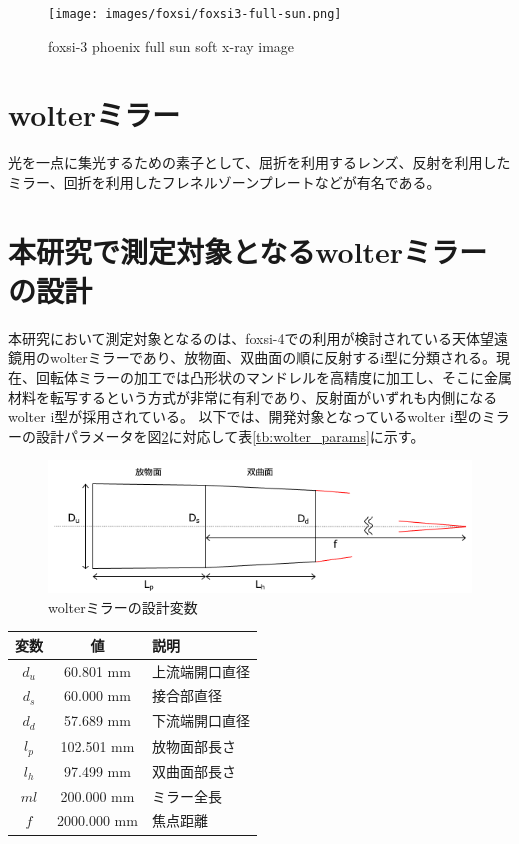 \documentclass[dvipdfmx,autodetect-engine]{jreport}
\begin{document}
\begin{figure}[h!]
\centering
\texttt{[image: images/foxsi/foxsi3-full-sun.png]}
\caption{foxsi-3 phoenix full sun soft x-ray image}
\label{fig:foxsi-fullsun-image}
\end{figure}

\section{wolterミラー}

光を一点に集光するための素子として、屈折を利用するレンズ、反射を利用したミラー、回折を利用したフレネルゾーンプレートなどが有名である。

\section{本研究で測定対象となるwolterミラーの設計}
本研究において測定対象となるのは、foxsi-4での利用が検討されている天体望遠鏡用のwolterミラーであり、放物面、双曲面の順に反射するi型に分類される。現在、回転体ミラーの加工では凸形状のマンドレルを高精度に加工し、そこに金属材料を転写するという方式が非常に有利であり、反射面がいずれも内側になるwolter i型が採用されている。
以下では、開発対象となっているwolter i型のミラーの設計パラメータを図\ref{fig:wolter_params}に対応して表\ref{tb:wolter_params}に示す。

\begin{figure}[h!]
\centering
\includegraphics[scale=0.55]{images/mirror_experiment/mirror_params.png}
\caption{wolterミラーの設計変数}
\label{fig:wolter_params}
\end{figure}

\begin{center}
  \begin{tabular}{|c|c|l|} \hline
    変数 & 値 & 説明 \\ \hline
    $d_u$ & 60.801 mm & 上流端開口直径 \\
    $d_s$ & 60.000 mm & 接合部直径 \\
    $d_d$ & 57.689 mm & 下流端開口直径 \\
    $l_p$ & 102.501 mm & 放物面部長さ \\
    $l_h$ & 97.499 mm & 双曲面部長さ \\
    $ml$ & 200.000 mm & ミラー全長 \\
    $f$ & 2000.000 mm & 焦点距離 \\ \hline
  \end{tabular}
  \label{tb:wolter_params}
  \caption{wolterミラー各設計変数の値}
\end{center}
\end{document}
